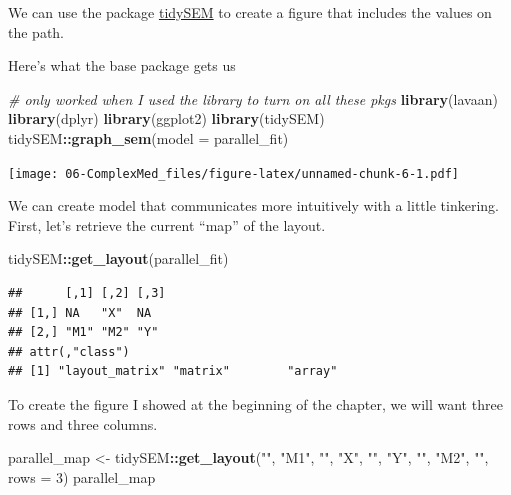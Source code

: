 \documentclass[
  11pt,
]{book}
\newenvironment{Shaded}{\begin{snugshade}}{\end{snugshade}}
\newcommand{\AttributeTok}[1]{\textcolor[rgb]{0.27,0.27,0.27}{#1}}
\newcommand{\CommentTok}[1]{\textcolor[rgb]{0.37,0.37,0.37}{\textit{#1}}}
\newcommand{\DecValTok}[1]{\textcolor[rgb]{0.06,0.06,0.06}{#1}}
\newcommand{\FunctionTok}[1]{\textcolor[rgb]{0.27,0.27,0.27}{\textbf{#1}}}
\newcommand{\NormalTok}[1]{#1}
\newcommand{\OtherTok}[1]{\textcolor[rgb]{0.37,0.37,0.37}{#1}}
\newcommand{\SpecialCharTok}[1]{\textcolor[rgb]{0.43,0.43,0.43}{\textbf{#1}}}
\newcommand{\StringTok}[1]{\textcolor[rgb]{0.5,0.5,0.5}{#1}}
\begin{document}
We can use the package \href{https://cjvanlissa.github.io/tidySEM/articles/Plotting_graphs.html}{tidySEM} to create a figure that includes the values on the path.

Here's what the base package gets us

\begin{Shaded}
\begin{Highlighting}[]
\CommentTok{\# only worked when I used the library to turn on all these pkgs}
\FunctionTok{library}\NormalTok{(lavaan)}
\FunctionTok{library}\NormalTok{(dplyr)}
\FunctionTok{library}\NormalTok{(ggplot2)}
\FunctionTok{library}\NormalTok{(tidySEM)}
\NormalTok{tidySEM}\SpecialCharTok{::}\FunctionTok{graph\_sem}\NormalTok{(}\AttributeTok{model =}\NormalTok{ parallel\_fit)}
\end{Highlighting}
\end{Shaded}

\texttt{[image: 06-ComplexMed\_files/figure-latex/unnamed-chunk-6-1.pdf]}

We can create model that communicates more intuitively with a little tinkering. First, let's retrieve the current ``map'' of the layout.

\begin{Shaded}
\begin{Highlighting}[]
\NormalTok{tidySEM}\SpecialCharTok{::}\FunctionTok{get\_layout}\NormalTok{(parallel\_fit)}
\end{Highlighting}
\end{Shaded}

\begin{verbatim}
##      [,1] [,2] [,3]
## [1,] NA   "X"  NA  
## [2,] "M1" "M2" "Y" 
## attr(,"class")
## [1] "layout_matrix" "matrix"        "array"
\end{verbatim}

To create the figure I showed at the beginning of the chapter, we will want three rows and three columns.

\begin{Shaded}
\begin{Highlighting}[]
\NormalTok{parallel\_map }\OtherTok{\textless{}{-}}\NormalTok{ tidySEM}\SpecialCharTok{::}\FunctionTok{get\_layout}\NormalTok{(}\StringTok{""}\NormalTok{, }\StringTok{"M1"}\NormalTok{, }\StringTok{""}\NormalTok{, }\StringTok{"X"}\NormalTok{, }\StringTok{""}\NormalTok{, }\StringTok{"Y"}\NormalTok{, }\StringTok{""}\NormalTok{, }\StringTok{"M2"}\NormalTok{,}
    \StringTok{""}\NormalTok{, }\AttributeTok{rows =} \DecValTok{3}\NormalTok{)}
\NormalTok{parallel\_map}
\end{Highlighting}
\end{Shaded}
\end{document}
